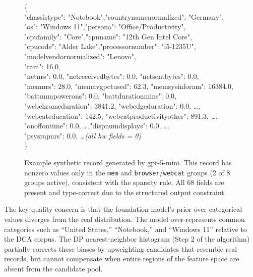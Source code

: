 \documentclass[12pt,letterpaper]{article}
\renewcommand{\_}{\textunderscore\allowbreak}
\begin{document}
\begin{figure}[H]
\centering
\begin{tcolorbox}[colback=gray!5, colframe=gray!60, fontupper=\scriptsize\ttfamily, left=2mm, right=2mm, top=1mm, bottom=1mm]
\{\\
\quad "chassistype": "Notebook",\quad "countryname\_normalized": "Germany",\\
\quad "os": "Windows 11",\quad "persona": "Office/Productivity",\\
\quad "cpu\_family": "Core",\quad "cpuname": "12th Gen Intel Core",\\
\quad "cpucode": "Alder Lake",\quad "processornumber": "i5-1235U",\\
\quad "modelvendor\_normalized": "Lenovo",\\
\quad "ram": 16.0,\\
\quad "net\_nrs": 0.0, "net\_received\_bytes": 0.0, "net\_sent\_bytes": 0.0,\\
\quad "mem\_nrs": 28.0, "mem\_avg\_pct\_used": 62.3, "mem\_sysinfo\_ram": 16384.0,\\
\quad "batt\_num\_power\_ons": 0.0, "batt\_duration\_mins": 0.0,\\
\quad "web\_chrome\_duration": 3841.2, "web\_edge\_duration": 0.0, \ldots,\\
\quad "webcat\_education": 142.5, "webcat\_productivity\_other": 891.3, \ldots,\\
\quad "onoff\_on\_time": 0.0, \ldots,\quad "disp\_num\_displays": 0.0, \ldots,\\
\quad "psys\_rap\_nrs": 0.0, \ldots\quad \textit{(all hw fields = 0)}\\
\}
\end{tcolorbox}
\caption{Example synthetic record generated by gpt-5-mini. This record has nonzero values only in the \texttt{mem} and \texttt{browser}/\texttt{webcat} groups (2 of 8 groups active), consistent with the sparsity rule. All 68 fields are present and type-correct due to the structured output constraint.}
\label{fig:pe-record}
\end{figure}

The key quality concern is that the foundation model's prior over categorical values diverges from the real distribution. The model over-represents common categories such as ``United States,'' ``Notebook,'' and ``Windows 11'' relative to the DCA corpus. The DP nearest-neighbor histogram (Step 2 of the algorithm) partially corrects these biases by upweighting candidates that resemble real records, but cannot compensate when entire regions of the feature space are absent from the candidate pool.
\end{document}
